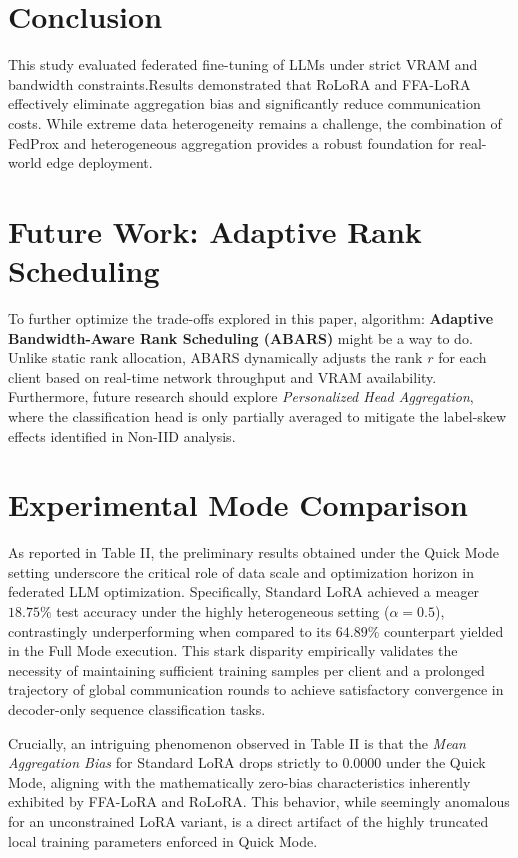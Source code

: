 \documentclass[journal]{IEEEtran}
\begin{document}
\section{Conclusion}
This study evaluated federated fine-tuning of LLMs under strict VRAM and bandwidth constraints.Results demonstrated that RoLoRA and FFA-LoRA effectively eliminate aggregation bias and significantly reduce communication costs. While extreme data heterogeneity remains a challenge, the combination of FedProx and heterogeneous aggregation provides a robust foundation for real-world edge deployment.

\section{Future Work: Adaptive Rank Scheduling}
To further optimize the trade-offs explored in this paper, algorithm: \textbf{Adaptive Bandwidth-Aware Rank Scheduling (ABARS)} might be a way to do. Unlike static rank allocation, ABARS dynamically adjusts the rank $r$ for each client based on real-time network throughput and VRAM availability. Furthermore, future research should explore \textit{Personalized Head Aggregation}, where the classification head is only partially averaged to mitigate the label-skew effects identified in Non-IID analysis.

\appendices
\section{Experimental Mode Comparison}
As reported in Table II, the preliminary results obtained under the Quick Mode setting underscore the critical role of data scale and optimization horizon in federated LLM optimization. Specifically, Standard LoRA achieved a meager $18.75\%$ test accuracy under the highly heterogeneous setting ($\alpha=0.5$), contrastingly underperforming when compared to its $64.89\%$ counterpart yielded in the Full Mode execution. This stark disparity empirically validates the necessity of maintaining sufficient training samples per client and a prolonged trajectory of global communication rounds to achieve satisfactory convergence in decoder-only sequence classification tasks. 

Crucially, an intriguing phenomenon observed in Table II is that the \textit{Mean Aggregation Bias} for Standard LoRA drops strictly to $0.0000$ under the Quick Mode, aligning with the mathematically zero-bias characteristics inherently exhibited by FFA-LoRA and RoLoRA. This behavior, while seemingly anomalous for an unconstrained LoRA variant, is a direct artifact of the highly truncated local training parameters enforced in Quick Mode. 
\end{document}
